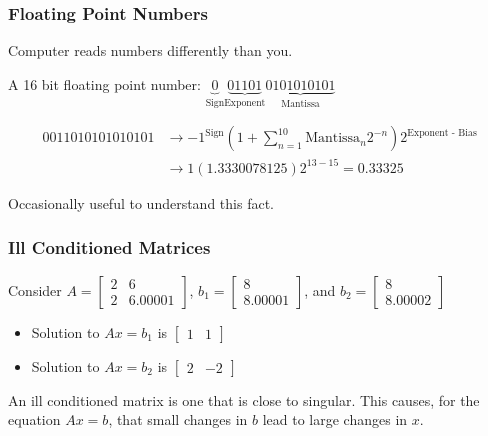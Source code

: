 \documentclass[10pt]{beamer}
\begin{document}
\begin{frame} \frametitle{Floating Point Numbers}
  Computer reads numbers differently than you.

  A 16 bit floating point number: $\underbrace{0}_{\text{Sign}} \underbrace{01101}_{\text{Exponent}} \underbrace{0101010101}_{\text{Mantissa}}$

  \begin{align*}
    0 01101 0101010101 &\rightarrow -1^{\text{Sign}} \left(1 + \sum_{n=1}^{10} \text{Mantissa}_n 2^{-n} \right) 2^{\text{Exponent - Bias}} \\
                       &\rightarrow 1 (1.3330078125) 2^{13 - 15} = 0.33325
  \end{align*}

  Occasionally useful to understand this fact.


\end{frame}

\begin{frame} \frametitle{Ill Conditioned Matrices}

Consider $A = \begin{bmatrix} 2 & 6 \\ 2 & 6.00001 \end{bmatrix}$, $b_1 = \begin{bmatrix} 8 \\ 8.00001 \end{bmatrix}$, and $b_2 = \begin{bmatrix} 8 \\ 8.00002 \end{bmatrix}$

  \begin{itemize}
    \item Solution to $A x = b_1$ is $\begin{bmatrix} 1 & 1 \end{bmatrix}$
    \item Solution to $A x = b_2$ is $\begin{bmatrix} 2 & -2 \end{bmatrix}$
  \end{itemize}

  An ill conditioned matrix is one that is close to singular. This causes, for the equation $A x = b$, that small changes in $b$ lead to large changes in $x$.

\end{frame}
\end{document}
